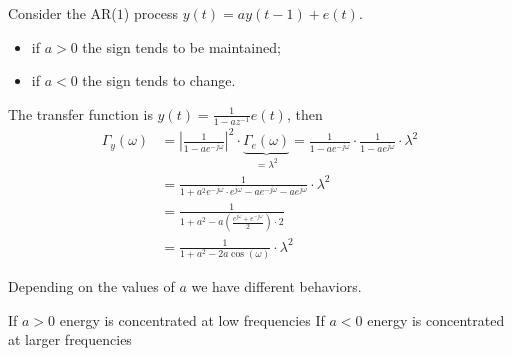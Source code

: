 \begin{figure}[htpb]
	\centering
\end{figure}
\FloatBarrier

\begin{exa}
Consider the AR($1$) process $y(t)=ay(t-1)+e(t)$.
\begin{itemize}
	\item if $a>0$ the sign tends to be maintained;
	\item if $a<0$ the sign tends to change.
\end{itemize}
The transfer function is $y(t)=\frac{1}{1-az^{-1} }e(t)$, then
\begin{align*}
	\Gamma _{y}(\omega )&=\left|\frac{1}{1-ae^{-j\omega } }\right|^2 \cdot\underbrace{\Gamma _{e}(\omega )}_{=\lambda^2 } = \frac{1}{1-ae^{-j\omega}}\cdot\frac{1}{1-ae^{j\omega}} \cdot\lambda^2\\
	&=\frac{1}{1+a^2 e^{-j\omega }\cdot e^{j\omega }-ae^{-j\omega}-ae^{j\omega}} \cdot \lambda^2\\
	&=\frac{1}{1+a^2 -a\left( \frac{e^{j\omega}+e^{-j\omega}}{2} \right)\cdot 2}\\
	&=\frac{1}{1+a^2-2a\cos (\omega)} \cdot\lambda^2
\end{align*}
\end{exa}
Depending on the values of $a$ we have different behaviors.

If $a>0$ energy is concentrated at low frequencies
If $a<0$ energy is concentrated at larger frequencies

